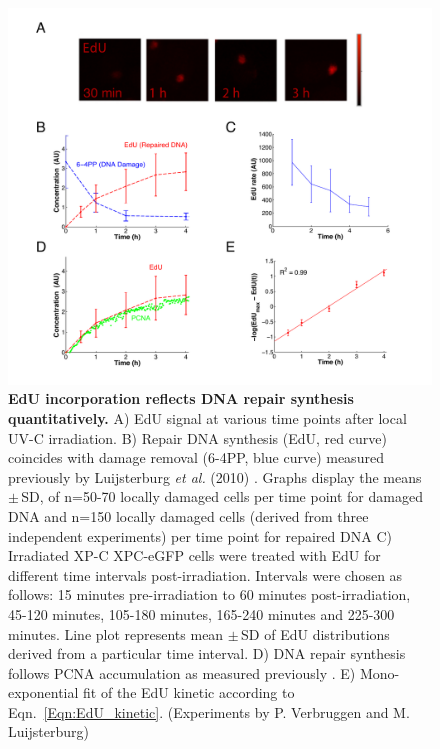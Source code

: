  \begin{figure}[t!]
\begin{center}
\includegraphics[width=1\textwidth]{Abbildungen/figure2_4.pdf}
\caption{\textbf{EdU incorporation reflects DNA repair synthesis quantitatively.} A) EdU signal at various time points after local UV-C irradiation. B) Repair DNA synthesis (EdU, red curve) coincides with damage removal (6-4PP, blue curve) measured previously by Luijsterburg \textit{et al.} (2010) \cite{Luijsterburg2010}. Graphs display the means $\pm$\,SD, of n=50-70 locally damaged cells per time point for damaged DNA and n=150 locally damaged cells (derived from three independent experiments) per time point for repaired DNA C) Irradiated XP-C XPC-eGFP cells were treated with EdU for different time intervals post-irradiation. Intervals were chosen as follows: 15 minutes pre-irradiation to 60 minutes post-irradiation, 45-120 minutes, 105-180 minutes, 165-240 minutes and 225-300 minutes. Line plot represents mean $\pm$\,SD of EdU distributions derived from a particular time interval. D) DNA repair synthesis follows PCNA accumulation as measured previously \cite{Luijsterburg2010}. E) Mono-exponential fit of the EdU kinetic according to Eqn.\ \ref{Eqn:EdU_kinetic}. (Experiments by P. Verbruggen and M. Luijsterburg)}
\label{fig:DNArepairKinetic}
%
%
\end{center}
\end{figure}
